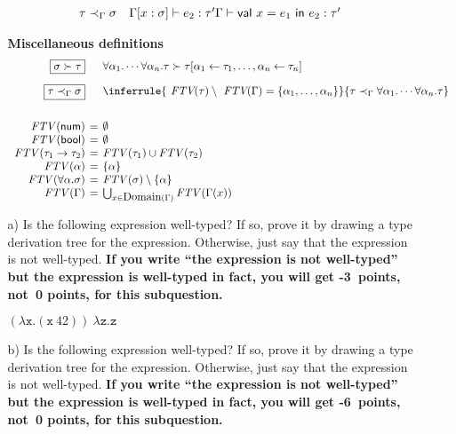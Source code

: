 \begin{enumerate}
\begin{itemize}
\[\begin{array}{ccc}
{    \tau\prec_\Gamma\sigma \quad\Gamma[x:\sigma]\vdash e_2 : \tau'
  }
  {\Gamma\vdash \textsf{val}\ x=e_1\ \textsf{in}\ e_2 : \tau'}
\end{array}
\]
  \item[] \textbf{ Miscellaneous definitions}
\[
\begin{array}{r@{\hskip4pt}c@{\hskip4pt}l}
  \fbox{$\sigma\succ\tau$}
  &&
  \forall\alpha_1.\cdots\forall\alpha_n.\tau\succ\tau[\alpha_1\leftarrow\tau_1,\ldots,\alpha_n\leftarrow\tau_n]
  \\[1em]
  \fbox{$\tau\prec_\Gamma\sigma$}
  &&
  \inferrule
  { \textit{ FTV}(\tau)\setminus\textit{ FTV}(\Gamma)=\{\alpha_1,\ldots,\alpha_n\} }
  { \tau\prec_\Gamma\forall\alpha_1.\cdots\forall\alpha_n.\tau }
  \\[2em]
\mathit{FTV}(\textsf{num}) &=& \emptyset
\\
\mathit{FTV}(\textsf{bool}) &=& \emptyset
\\
\mathit{FTV}(\tau_1\rightarrow\tau_2) &=& \mathit{FTV}(\tau_1) \cup \mathit{FTV}(\tau_2)
\\
\mathit{FTV}(\alpha) &=& \{\alpha\}
\\
\mathit{FTV}(\forall\alpha.\sigma) &=& \mathit{FTV}(\sigma) \setminus \{\alpha\}
\\
\mathit{FTV}(\Gamma) &=& \bigcup_{x\in\Dom{\Gamma}}\mathit{FTV}(\Gamma(x))
\\
\end{array}
\]
\end{itemize}

\begin{itemize}
\item[a)] Is the following expression well-typed? If so, prove it by
  drawing a type derivation tree for the expression. Otherwise, just say that
    the expression is not well-typed. \textbf{ If you write ``the expression is not
    well-typed'' but the expression is well-typed in fact, you will get
    -3~points, not~0 points, for this subquestion.}

    $(\lambda \texttt{x}.(\texttt{x}\ 42))\ \lambda \texttt{z}.\texttt{z}$
\item[b)] Is the following expression well-typed? If so, prove it by
  drawing a type derivation tree for the expression. Otherwise, just say that
    the expression is not well-typed. \textbf{ If you write ``the expression is not
    well-typed'' but the expression is well-typed in fact, you will get
    -6~points, not~0 points, for this subquestion.}


\end{itemize}
\end{enumerate}
